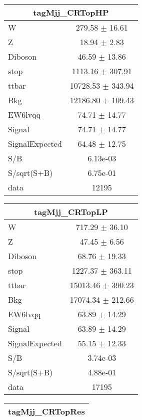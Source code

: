 \begin{table}
\centering
\small
\begin{tabular}{|l|c|}
\hline
 \multicolumn{2}{|c|}{tagMjj\_CRTopHP}\\ \hline
W & 279.58 $\pm$ 16.61\\
Z & 18.94 $\pm$ 2.83\\
Diboson & 46.59 $\pm$ 13.86\\
stop & 1113.16 $\pm$ 307.91\\
ttbar & 10728.53 $\pm$ 343.94\\
\hline
Bkg & 12186.80 $\pm$ 109.43\\
\hline
EW6lvqq & 74.71 $\pm$ 14.77\\
\hline
Signal & 74.71 $\pm$ 14.77\\
SignalExpected & 64.48 $\pm$ 12.75\\
\hline
S/B & 6.13e-03\\
S/sqrt(S+B) & 6.75e-01\\
\hline
data & 12195\\ \hline
\end{tabular}
\begin{tabular}{|l|c|}
\hline
 \multicolumn{2}{|c|}{tagMjj\_CRTopLP}\\ \hline
W & 717.29 $\pm$ 36.10\\
Z & 47.45 $\pm$ 6.56\\
Diboson & 68.76 $\pm$ 19.33\\
stop & 1227.37 $\pm$ 363.11\\
ttbar & 15013.46 $\pm$ 390.23\\
\hline
Bkg & 17074.34 $\pm$ 212.66\\
\hline
EW6lvqq & 63.89 $\pm$ 14.29\\
\hline
Signal & 63.89 $\pm$ 14.29\\
SignalExpected & 55.15 $\pm$ 12.33\\
\hline
S/B & 3.74e-03\\
S/sqrt(S+B) & 4.88e-01\\
\hline
data & 17195\\ \hline
\end{tabular}
\begin{tabular}{|l|c|}
\hline
 \multicolumn{2}{|c|}{tagMjj\_CRTopRes}\\ \hline

\end{tabular}
\end{table}
